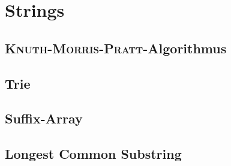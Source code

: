 \section{Strings}

\subsection{\textsc{Knuth-Morris-Pratt}-Algorithmus}


\subsection{Trie}


\subsection{Suffix-Array}


\subsection{Longest Common Substring}

